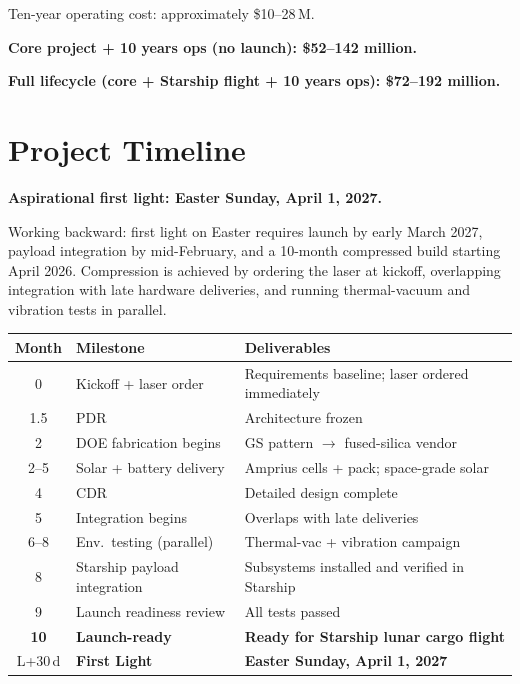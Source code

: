 \documentclass[12pt,letterpaper]{article}
\begin{document}
\noindent Ten-year operating cost: approximately \$10--28\,M.

\medskip
\noindent \textbf{Core project + 10 years ops (no launch): \$52--142 million.}

\noindent \textbf{Full lifecycle (core + Starship flight + 10 years ops):
\$72--192 million.}

\section{Project Timeline}

\textbf{Aspirational first light: Easter Sunday, April 1, 2027.}

\medskip
\noindent Working backward: first light on Easter requires launch by early March
2027, payload integration by mid-February, and a 10-month compressed build
starting April 2026. Compression is achieved by ordering the laser at kickoff,
overlapping integration with late hardware deliveries, and running
thermal-vacuum and vibration tests in parallel.

\begin{center}
\begin{tabular}{clp{7cm}}
\toprule
\textbf{Month} & \textbf{Milestone} & \textbf{Deliverables} \\
\midrule
0 & Kickoff + laser order & Requirements baseline; laser ordered immediately \\
1.5 & PDR & Architecture frozen \\
2 & DOE fabrication begins & GS pattern $\to$ fused-silica vendor \\
2--5 & Solar + battery delivery & Amprius cells + pack; space-grade solar \\
4 & CDR & Detailed design complete \\
5 & Integration begins & Overlaps with late deliveries \\
6--8 & Env.\ testing (parallel) & Thermal-vac + vibration campaign \\
8 & Starship payload integration & Subsystems installed and verified in Starship \\
9 & Launch readiness review & All tests passed \\
\textbf{10} & \textbf{Launch-ready} & \textbf{Ready for Starship lunar cargo flight} \\
L+30\,d & \textbf{First Light} & \textbf{Easter Sunday, April 1, 2027} \\
\bottomrule
\end{tabular}
\end{center}
\end{document}
